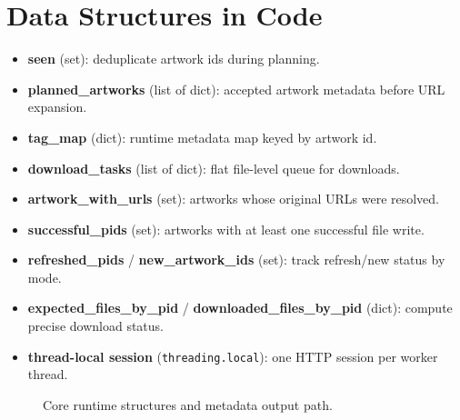 \documentclass[11pt]{article}
\begin{document}
\section{Data Structures in Code}
\begin{itemize}
    \item \textbf{seen} (set): deduplicate artwork ids during planning.
    \item \textbf{planned\_artworks} (list of dict): accepted artwork metadata before URL expansion.
    \item \textbf{tag\_map} (dict): runtime metadata map keyed by artwork id.
    \item \textbf{download\_tasks} (list of dict): flat file-level queue for downloads.
    \item \textbf{artwork\_with\_urls} (set): artworks whose original URLs were resolved.
    \item \textbf{successful\_pids} (set): artworks with at least one successful file write.
    \item \textbf{refreshed\_pids} / \textbf{new\_artwork\_ids} (set): track refresh/new status by mode.
    \item \textbf{expected\_files\_by\_pid} / \textbf{downloaded\_files\_by\_pid} (dict): compute precise download status.
    \item \textbf{thread-local session} (\texttt{threading.local}): one HTTP session per worker thread.
\end{itemize}

\begin{figure}[htbp]
\centering
{}
\caption{Core runtime structures and metadata output path.}
\end{figure}
\end{document}
